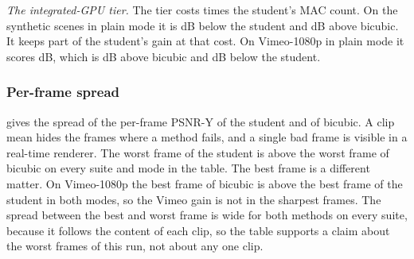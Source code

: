 \emph{The integrated-GPU tier.} The  tier costs  times the  student's MAC count. On the synthetic scenes in plain mode it is  dB below the student and  dB above bicubic. \Preliminary{} It keeps part of the student's gain at that cost. On Vimeo-1080p in plain mode it scores  dB, which is  dB above bicubic and  dB below the student.

\subsubsection{Per-frame spread}\label{sec:tsrr-perframe}

 gives the spread of the per-frame PSNR-Y of the student and of bicubic. A clip mean hides the frames where a method fails, and a single bad frame is visible in a real-time renderer. \Preliminary{} The worst frame of the student is above the worst frame of bicubic on every suite and mode in the table. The best frame is a different matter. On Vimeo-1080p the best frame of bicubic is above the best frame of the student in both modes, so the Vimeo gain is not in the sharpest frames. The spread between the best and worst frame is wide for both methods on every suite, because it follows the content of each clip, so the table supports a claim about the worst frames of this run, not about any one clip.

